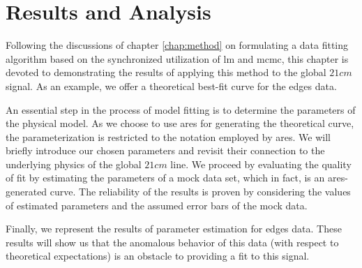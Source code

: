 \documentclass[12pt, TexShade, letterpaper]{report}
\begin{document}
\chapter{Results and Analysis}
\label{chap:results}
Following the discussions of chapter \ref{chap:method} on formulating a data fitting algorithm based on the synchronized utilization of \gls{lm} and \gls{mcmc}, this chapter is devoted to demonstrating the results of applying this method to the global $21cm$ signal. As an example, we offer a theoretical best-fit curve for the \gls{edges} data. \par
An essential step in the process of model fitting is to determine the parameters of the physical model. As we choose to use \gls{ares} for generating the theoretical curve, the parameterization is restricted to the notation employed by \gls{ares}. We will briefly introduce our chosen parameters and revisit their connection to the underlying physics of the global $21cm$ line. We proceed by evaluating the quality of fit by estimating the parameters of a mock data set, which in fact, is an \gls{ares}-generated curve. The reliability of the results is proven by considering the values of estimated parameters and the assumed error bars of the mock data. \par
Finally, we represent the results of parameter estimation for \gls{edges} data. These results will show us that the anomalous behavior of this data (with respect to theoretical expectations) is an obstacle to providing a fit to this signal.\par
\end{document}
